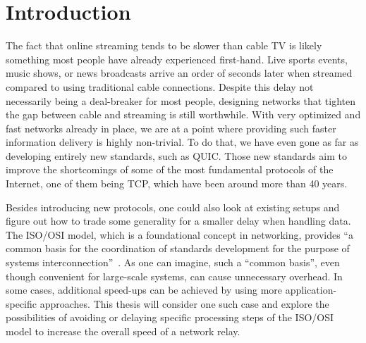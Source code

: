 
\chapter{Introduction}\label{chap:introduction}


The fact that online streaming tends to be slower than cable TV is likely something most people have already 
experienced first-hand.
Live sports events, music shows, or news broadcasts arrive an order of seconds later when streamed compared
to using traditional cable connections. %
Despite this delay not necessarily being a deal-breaker for most people, designing networks that 
tighten the gap between cable and streaming is still worthwhile.
With very optimized and fast networks already in place, we are at a point where providing such faster information
delivery is highly non-trivial.
To do that, we have even gone as far as developing entirely new standards, such as QUIC\@. 
Those new standards aim to improve the shortcomings of some of the most fundamental protocols of the Internet, one of them being TCP, which have been around more than 40 years. 


Besides introducing new protocols, one could also look at existing setups and figure out how to trade some generality
for a smaller delay when handling data.
The ISO/OSI model, which is a foundational concept in networking, provides ``a common basis for the coordination 
of standards development for the purpose of systems interconnection''~\parencite{iso-osi-standard}.
As one can imagine, such a ``common basis'', even though convenient for large-scale systems, can cause unnecessary
overhead.
In some cases, additional speed-ups can be achieved by using more application-specific approaches.
This thesis will consider one such case and explore the possibilities of avoiding or delaying specific processing
steps of the ISO/OSI model to increase the overall speed of a network relay.






